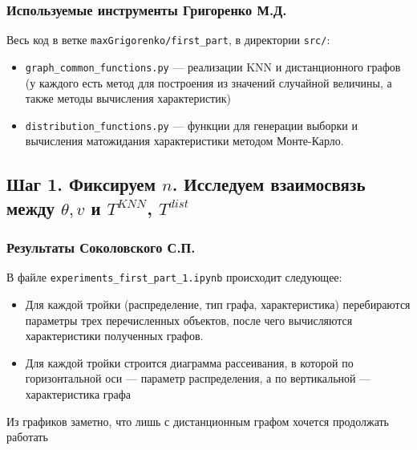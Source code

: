 \documentclass[a4paper,12pt]{article}
\begin{document}
\subsubsection*{Используемые инструменты Григоренко М.Д.}
Весь код в ветке \texttt{maxGrigorenko/first\_part}, в директории \texttt{src/}:
\begin{itemize}
    \item \texttt{graph\_common\_functions.py} --- реализации KNN и дистанционного графов (у каждого есть метод для построения из значений случайной величины, а также методы вычисления характеристик)
    \item \texttt{distribution\_functions.py} --- функции для генерации выборки и вычисления матожидания характеристики методом Монте-Карло.
\end{itemize}


\subsection{Шаг 1. Фиксируем $n$. Исследуем взаимосвязь между $\theta, v$ и $T^{KNN}$, $T^{dist}$}
\subsubsection*{Результаты Соколовского С.П.}
В файле \texttt{experiments\_first\_part\_1.ipynb} происходит следующее:
\begin{itemize}
    \item Для каждой тройки (распределение, тип графа, характеристика) перебираются параметры трех перечисленных объектов, после чего вычисляются характеристики полученных графов.
    \item Для каждой тройки строится диаграмма рассеивания, в которой по горизонтальной оси --- параметр распределения, а по вертикальной --- характеристика графа
\end{itemize}
Из графиков заметно, что лишь с дистанционным графом хочется продолжать работать
\end{document}
